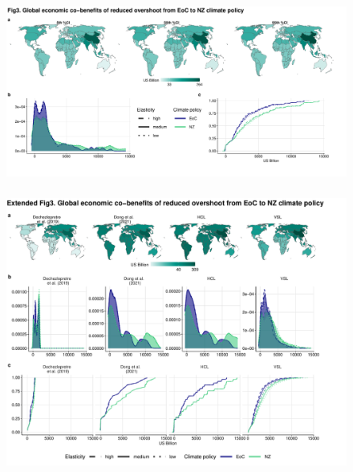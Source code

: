 \begin{frame}
    \frametitle{}
    \begin{figure}[htb!]
        \centering
        \includegraphics[width = \linewidth]{Images_statistical_meth/econ_cobenefits_2030.pdf}
    \end{figure}    
    \vfill \hfill \tiny{\cite{rodes-bachs_beyond_ap}}
\end{frame}
\begin{frame}
    \frametitle{}
    \begin{figure}[htb!]
        \centering
        \includegraphics[width = 0.8\linewidth]{Images_statistical_meth/extended_econ_cobenefits_2030.pdf}
    \end{figure}    
    \vfill \hfill \tiny{\cite{rodes-bachs_beyond_ap}}
\end{frame}



